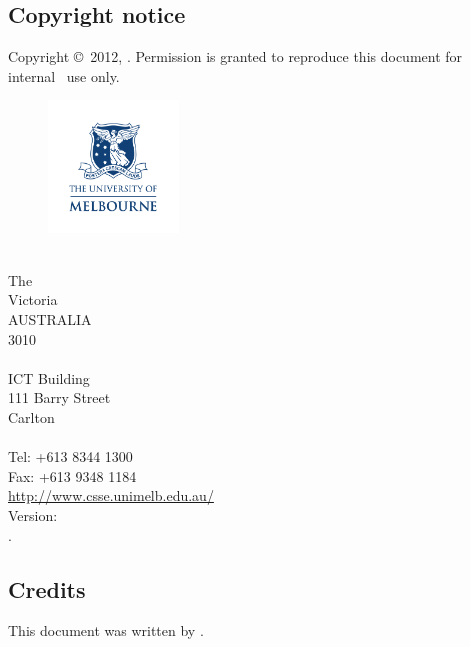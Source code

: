 

\subsection*{Copyright notice}

Copyright \copyright~2012, \authors.
Permission is granted to reproduce this document for internal \team~use only.

\begin{figure}
	\begin{flushleft}
    	\includegraphics[height=35mm]{figs/UOM_logo}
	\end{flushleft}
\end{figure}
\csse\\
The \UoM\\
Victoria\\
AUSTRALIA\\
3010\\
\\
ICT Building\\
111 Barry Street\\
Carlton\\
\\
Tel: +613 8344 1300\\
Fax: +613 9348 1184\\
\url{http://www.csse.unimelb.edu.au/}\\

Version: \revision \\
\vdate. \\



\subsection*{Credits}

This document was written by \authors.

